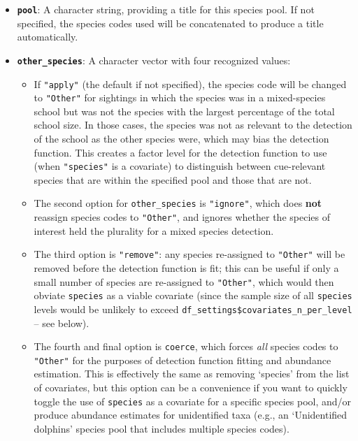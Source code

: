 \documentclass[
]{book}
\providecommand{\tightlist}{%
  \setlength{\itemsep}{0pt}\setlength{\parskip}{0pt}}
\begin{document}
\begin{itemize}
\item
  \textbf{\texttt{pool}}: A character string, providing a title for this species pool. If not specified, the species codes used will be concatenated to produce a title automatically.
\item
  \textbf{\texttt{other\_species}}: A character vector with four recognized values:

  \begin{itemize}
  \tightlist
  \item
    If \texttt{"apply"} (the default if not specified), the species code will be changed to \texttt{"Other"} for sightings in which the species was in a mixed-species school but was not the species with the largest percentage of the total school size. In those cases, the species was not as relevant to the detection of the school as the other species were, which may bias the detection function. This creates a factor level for the detection function to use (when \texttt{"species"} is a covariate) to distinguish between cue-relevant species that are within the specified pool and those that are not.
  \item
    The second option for \texttt{other\_species} is \texttt{"ignore"}, which does \textbf{not} reassign species codes to \texttt{"Other"}, and ignores whether the species of interest held the plurality for a mixed species detection.
  \item
    The third option is \texttt{"remove"}: any species re-assigned to \texttt{"Other"} will be removed before the detection function is fit; this can be useful if only a small number of species are re-assigned to \texttt{"Other"}, which would then obviate \texttt{species} as a viable covariate (since the sample size of all \texttt{species} levels would be unlikely to exceed \texttt{df\_settings\$covariates\_n\_per\_level} -- see below). 
  \item
    The fourth and final option is \texttt{coerce}, which forces \emph{all} species codes to \texttt{"Other"} for the purposes of detection function fitting and abundance estimation. This is effectively the same as removing `species' from the list of covariates, but this option can be a convenience if you want to quickly toggle the use of \texttt{species} as a covariate for a specific species pool, and/or produce abundance estimates for unidentified taxa (e.g., an `Unidentified dolphins' species pool that includes multiple species codes).
  \end{itemize}
\end{itemize}
\end{document}
